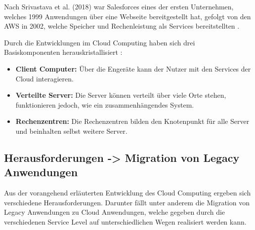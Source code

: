 Nach Srivastava et al. (2018) war Salesforces eines der ersten Unternehmen, welches 1999 Anwendungen über eine Webseite bereitgestellt hat,
gefolgt von den \acf{AWS} in 2002, welche Speicher und Rechenleistung als Services bereitstellten \cite[Vgl.][S. 17f]{Srivastava2018}.

Durch die Entwicklungen im Cloud Computing haben sich drei Basiskomponenten herauskristallisiert \cite[Vgl.][S. 18]{Srivastava2018}:
\begin{itemize}
\item \textbf{Client Computer:} Über die Engeräte kann der Nutzer mit den Services der Cloud interagieren.
\item \textbf{Verteilte Server:} Die Server können verteilt über viele Orte stehen, funktionieren jedoch, wie ein zusammenhängendes System.
\item \textbf{Rechenzentren:} Die Rechenzentren bilden den Knotenpunkt für alle Server und beinhalten selbst weitere Server.
\end{itemize}

\pagebreak

\subsection{Herausforderungen -> Migration von Legacy Anwendungen}

Aus der vorangehend erläuterten Entwicklung des Cloud Computing ergeben sich verschiedene Herausforderungen.
Darunter fällt unter anderem die Migration von Legacy Anwendungen zu Cloud Anwendungen, welche gegeben durch die verschiedenen Service Level
auf unterschiedlichen Wegen realisiert werden kann.